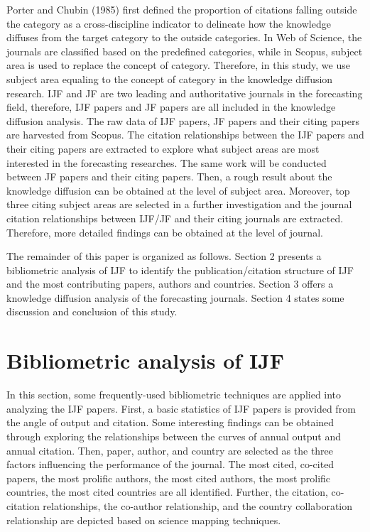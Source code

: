 \documentclass[11pt,a4paper]{elsarticle} %
\begin{document}
Porter and Chubin (1985) first defined the proportion of citations
falling outside the category as a cross-discipline indicator to
delineate how the knowledge diffuses from the target category to the
outside categories. In Web of Science, the journals are classified based
on the predefined categories, while in Scopus, subject area is used to
replace the concept of category. Therefore, in this study, we use
subject area equaling to the concept of category in the knowledge
diffusion research. IJF and JF are two leading and authoritative
journals in the forecasting field, therefore, IJF papers and JF papers
are all included in the knowledge diffusion analysis. The raw data of
IJF papers, JF papers and their citing papers are harvested from Scopus.
The citation relationships between the IJF papers and their citing
papers are extracted to explore what subject areas are most interested
in the forecasting researches. The same work will be conducted between
JF papers and their citing papers. Then, a rough result about the
knowledge diffusion can be obtained at the level of subject area.
Moreover, top three citing subject areas are selected in a further
investigation and the journal citation relationships between IJF/JF and
their citing journals are extracted. Therefore, more detailed findings
can be obtained at the level of journal.

The remainder of this paper is organized as follows. Section 2 presents
a bibliometric analysis of IJF to identify the publication/citation
structure of IJF and the most contributing papers, authors and
countries. Section 3 offers a knowledge diffusion analysis of the
forecasting journals. Section 4 states some discussion and conclusion of
this study.

\section{Bibliometric analysis of
IJF}\label{bibliometric-analysis-of-ijf}

In this section, some frequently-used bibliometric techniques are
applied into analyzing the IJF papers. First, a basic statistics of IJF
papers is provided from the angle of output and citation. Some
interesting findings can be obtained through exploring the relationships
between the curves of annual output and annual citation. Then, paper,
author, and country are selected as the three factors influencing the
performance of the journal. The most cited, co-cited papers, the most
prolific authors, the most cited authors, the most prolific countries,
the most cited countries are all identified. Further, the citation,
co-citation relationships, the co-author relationship, and the country
collaboration relationship are depicted based on science mapping
techniques.
\end{document}

